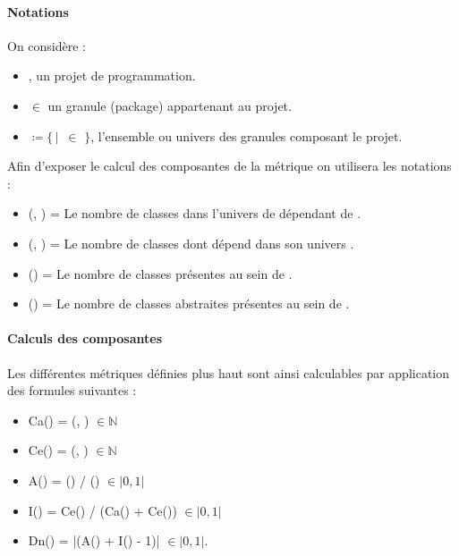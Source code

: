\documentclass{scrartcl}
\begin{document}
    \paragraph{Notations}On considère :
    \begin{itemize}
        \item \project{}, un projet de programmation.
        \item \granule{} $\in$ \project{} un granule (package) appartenant au projet.
        \item \granuleUniverse{} $\coloneqq \{$\granule{}$ \, | \, $ \granule{} $\in$ \project{}$\}$, l'ensemble ou univers des granules composant le projet.
    \end{itemize}
    Afin d'exposer le calcul des composantes de la métrique on utilisera les notations :
    \begin{itemize}
        \item \dependantClasses{}(\granule{}, \granuleUniverse{}) = Le nombre de classes dans l'univers \granuleUniverse{} de \granule{} dépendant de \granule{}.
        \item \dependedClasses{}(\granule{}, \granuleUniverse{}) = Le nombre de classes dont dépend \granule{} dans son univers \granuleUniverse{}.
        \item \numberOfClass{}(\granule{}) = Le nombre de classes présentes au sein de \granule{}.
        \item \numberOfabstractClass{}(\granule{}) = Le nombre de classes abstraites présentes au sein de \granule{}.
    \end{itemize}


    
    \paragraph{Calculs des composantes}Les différentes métriques définies plus haut sont ainsi calculables par application des formules suivantes : 
    \begin{itemize}
        \item Ca(\granule{}) = \dependantClasses{}(\granule{}, \granuleUniverse{}) $\in \mathbb{N}$
        
        \item Ce(\granule{}) = \dependedClasses{}(\granule{}, \granuleUniverse{}) $\in \mathbb{N}$
        
        \item A(\granule{}) = \numberOfabstractClass{}(\granule{}) /
        {\numberOfClass{}(\granule{})} $\in \lvert 0, 1\rvert$

        \item I(\granule{}) = Ce(\granule{}) / (Ca(\granule{}) + Ce(\granule{})) $\in \lvert 0, 1\rvert$
        
        \item Dn(\granule{}) = |(A(\granule{}) + I(\granule{}) - 1)| $\in \lvert 0, 1\rvert$.
    \end{itemize}
\end{document}
